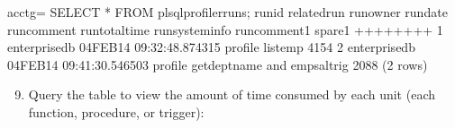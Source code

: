 \documentclass[letterpaper,10pt,english,openany,oneside]{sphinxmanual}
\begin{document}
%
\begin{sphinxVerbatim}[commandchars=\\\{\}]
acctg=\PYGZsh{} SELECT * FROM plsql\PYGZus{}profiler\PYGZus{}runs;
 runid \textbar{} related\PYGZus{}run \textbar{}  run\PYGZus{}owner   \textbar{}         run\PYGZus{}date          \textbar{}              run\PYGZus{}comment
\textbar{}run\PYGZus{}total\PYGZus{}time \textbar{} run\PYGZus{}system\PYGZus{}info \textbar{} run\PYGZus{}comment1 \textbar{} spare1
\PYGZhy{}\PYGZhy{}\PYGZhy{}\PYGZhy{}\PYGZhy{}\PYGZhy{}\PYGZhy{}+\PYGZhy{}\PYGZhy{}\PYGZhy{}\PYGZhy{}\PYGZhy{}\PYGZhy{}\PYGZhy{}\PYGZhy{}\PYGZhy{}\PYGZhy{}\PYGZhy{}\PYGZhy{}\PYGZhy{}+\PYGZhy{}\PYGZhy{}\PYGZhy{}\PYGZhy{}\PYGZhy{}\PYGZhy{}\PYGZhy{}\PYGZhy{}\PYGZhy{}\PYGZhy{}\PYGZhy{}\PYGZhy{}\PYGZhy{}\PYGZhy{}+\PYGZhy{}\PYGZhy{}\PYGZhy{}\PYGZhy{}\PYGZhy{}\PYGZhy{}\PYGZhy{}\PYGZhy{}\PYGZhy{}\PYGZhy{}\PYGZhy{}\PYGZhy{}\PYGZhy{}\PYGZhy{}\PYGZhy{}\PYGZhy{}\PYGZhy{}\PYGZhy{}\PYGZhy{}\PYGZhy{}\PYGZhy{}\PYGZhy{}\PYGZhy{}\PYGZhy{}\PYGZhy{}\PYGZhy{}\PYGZhy{}+\PYGZhy{}\PYGZhy{}\PYGZhy{}\PYGZhy{}\PYGZhy{}\PYGZhy{}\PYGZhy{}\PYGZhy{}\PYGZhy{}\PYGZhy{}\PYGZhy{}\PYGZhy{}\PYGZhy{}\PYGZhy{}\PYGZhy{}\PYGZhy{}\PYGZhy{}\PYGZhy{}\PYGZhy{}\PYGZhy{}\PYGZhy{}\PYGZhy{}\PYGZhy{}\PYGZhy{}\PYGZhy{}\PYGZhy{}\PYGZhy{}\PYGZhy{}\PYGZhy{}\PYGZhy{}\PYGZhy{}\PYGZhy{}\PYGZhy{}\PYGZhy{}\PYGZhy{}\PYGZhy{}\PYGZhy{}\PYGZhy{}\PYGZhy{}\PYGZhy{}+\PYGZhy{}\PYGZhy{}\PYGZhy{}\PYGZhy{}\PYGZhy{}\PYGZhy{}\PYGZhy{}\PYGZhy{}\PYGZhy{}\PYGZhy{}\PYGZhy{}\PYGZhy{}\PYGZhy{}\PYGZhy{}\PYGZhy{}\PYGZhy{}+\PYGZhy{}\PYGZhy{}\PYGZhy{}\PYGZhy{}\PYGZhy{}\PYGZhy{}\PYGZhy{}\PYGZhy{}\PYGZhy{}\PYGZhy{}\PYGZhy{}\PYGZhy{}\PYGZhy{}\PYGZhy{}\PYGZhy{}\PYGZhy{}\PYGZhy{}+\PYGZhy{}\PYGZhy{}\PYGZhy{}\PYGZhy{}\PYGZhy{}\PYGZhy{}\PYGZhy{}\PYGZhy{}\PYGZhy{}\PYGZhy{}\PYGZhy{}\PYGZhy{}\PYGZhy{}\PYGZhy{}+\PYGZhy{}\PYGZhy{}\PYGZhy{}\PYGZhy{}\PYGZhy{}\PYGZhy{}\PYGZhy{}\PYGZhy{}
     1 \textbar{}             \textbar{} enterprisedb \textbar{} 04\PYGZhy{}FEB\PYGZhy{}14 09:32:48.874315 \textbar{} profile list\PYGZus{}emp                       \textbar{}           4154 \textbar{}                 \textbar{}              \textbar{}
     2 \textbar{}             \textbar{} enterprisedb \textbar{} 04\PYGZhy{}FEB\PYGZhy{}14 09:41:30.546503 \textbar{} profile get\PYGZus{}dept\PYGZus{}name and emp\PYGZus{}sal\PYGZus{}trig \textbar{}           2088 \textbar{}                 \textbar{}              \textbar{}
(2 rows)
\end{sphinxVerbatim}
\begin{enumerate}
\setcounter{enumi}{8}
\item {} 
Query the  table to view the amount of time
consumed by each unit (each function, procedure, or trigger):

\end{enumerate}
\end{document}
